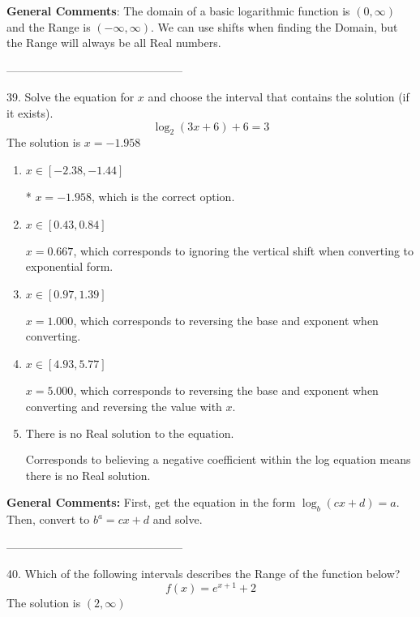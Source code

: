 \documentclass{article}[14pt]
\begin{document}
\textbf{General Comments}: The domain of a basic logarithmic function is $(0, \infty)$ and the Range is $(-\infty, \infty)$. We can use shifts when finding the Domain, but the Range will always be all Real numbers.

-----------------------------------------------

39. Solve the equation for $x$ and choose the interval that contains the solution (if it exists).
$$ \log_{2}{(3x+6)}+6 = 3 $$ 
The solution is $ x = -1.958 $ 

\begin{enumerate}[label=\Alph*.] 
\item $ x \in [-2.38, -1.44] $ 

 * $x = -1.958$, which is the correct option. 
\item $ x \in [0.43, 0.84] $ 

 $x = 0.667$, which corresponds to ignoring the vertical shift when converting to exponential form. 
\item $ x \in [0.97, 1.39] $ 

 $x = 1.000$, which corresponds to reversing the base and exponent when converting. 
\item $ x \in [4.93, 5.77] $ 

 $x = 5.000$, which corresponds to reversing the base and exponent when converting and reversing the value with $x$. 
\item $ \text{There is no Real solution to the equation.} $ 

 Corresponds to believing a negative coefficient within the log equation means there is no Real solution. 
\end{enumerate} 
 
\textbf{General Comments:} First, get the equation in the form $\log_b{(cx+d)} = a$. Then, convert to $b^a = cx+d$ and solve.

-----------------------------------------------

40. Which of the following intervals describes the Range of the function below?
$$ f(x) = e^{x+1}+2 $$ 
The solution is $ (2, \infty) $ 
\end{document}
